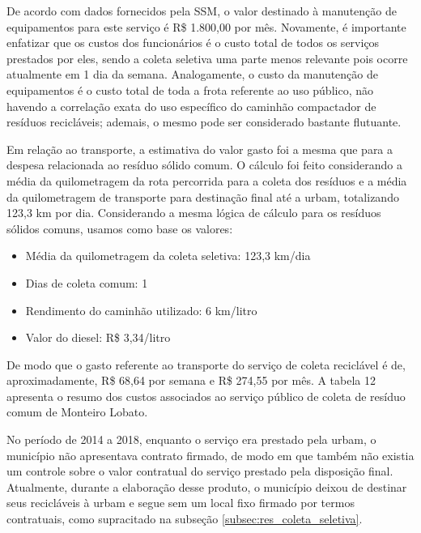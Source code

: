 	De acordo com dados fornecidos pela SSM, o valor destinado à manutenção de equipamentos para este serviço é R\$ 1.800,00 por mês. 
	Novamente, é importante enfatizar que os custos dos funcionários é o custo total de todos os serviços prestados por eles, sendo a coleta seletiva uma parte menos relevante pois ocorre atualmente em 1 dia da semana. Analogamente, o custo da manutenção de equipamentos é o custo total de toda a frota referente ao uso público, não havendo a correlação exata do uso específico do caminhão compactador de resíduos recicláveis; ademais, o mesmo pode ser considerado bastante flutuante.

	Em relação ao transporte, a estimativa do valor gasto foi a mesma que para a despesa relacionada ao resíduo sólido comum. O cálculo foi feito considerando a média da quilometragem da rota percorrida para a coleta dos resíduos e a média da quilometragem de transporte para destinação final até a \gls{urbam}, totalizando 123,3 km por dia. Considerando a mesma lógica de cálculo para os resíduos sólidos comuns, usamos como base os valores:
	
	\begin{itemize}
		\item Média da quilometragem da coleta seletiva: 123,3 km/dia
		\item Dias de coleta comum: 1
		\item Rendimento do caminhão utilizado: 6 km/litro
		\item Valor do diesel: R\$ 3,34/litro
	\end{itemize} 
	
	De modo que o gasto referente ao transporte do serviço de coleta reciclável é de, aproximadamente, R\$ 68,64 por semana e R\$ 274,55 por mês. A tabela 12 apresenta o resumo dos custos associados ao serviço público de coleta de resíduo comum de Monteiro Lobato.
	

	
	
	
	No período de 2014 a 2018, enquanto o serviço era prestado pela \gls{urbam}, o município não apresentava contrato firmado, de modo em que também não existia um controle sobre o valor contratual do serviço prestado pela disposição final. Atualmente, durante a elaboração desse produto, o município deixou de destinar seus recicláveis à \gls{urbam} e segue sem um local fixo firmado por termos contratuais, como supracitado na subseção \ref{subsec:res_coleta_seletiva}.
	
	
